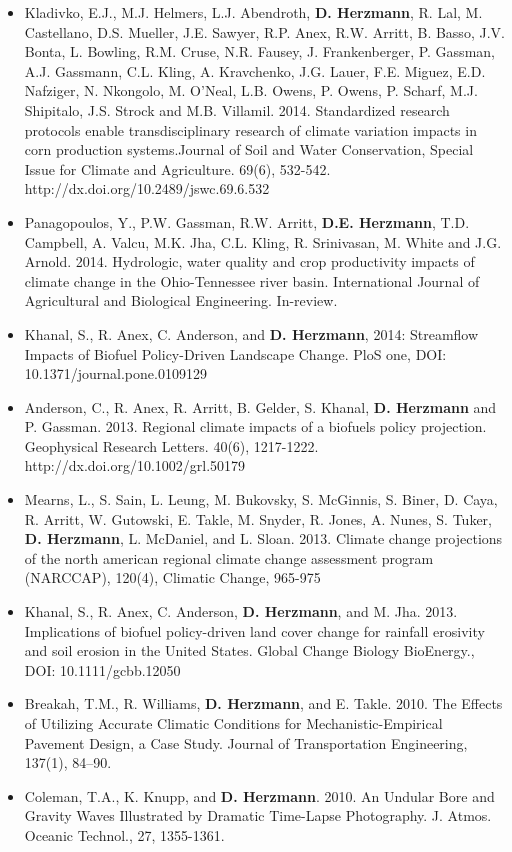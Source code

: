 \begin{itemize}
\item Kladivko, E.J., M.J. Helmers, L.J. Abendroth, \textbf{D. Herzmann}, R. Lal, M. Castellano, D.S. Mueller, J.E. Sawyer, R.P. Anex, R.W. Arritt, B. Basso, J.V. Bonta, L. Bowling, R.M. Cruse, N.R. Fausey, J. Frankenberger, P. Gassman, A.J. Gassmann, C.L. Kling, A. Kravchenko, J.G. Lauer, F.E. Miguez, E.D. Nafziger, N. Nkongolo, M. O'Neal, L.B. Owens, P. Owens, P. Scharf, M.J. Shipitalo, J.S. Strock and M.B. Villamil. 2014. Standardized research protocols enable transdisciplinary research of climate variation impacts in corn production systems.Journal of Soil and Water Conservation, Special Issue for Climate and Agriculture. 69(6), 532-542. http://dx.doi.org/10.2489/jswc.69.6.532
\item Panagopoulos, Y., P.W. Gassman, R.W. Arritt, \textbf{D.E. Herzmann}, T.D. Campbell, A. Valcu, M.K. Jha, C.L. Kling, R. Srinivasan, M. White and J.G. Arnold. 2014. Hydrologic, water quality and crop productivity impacts of climate change in the Ohio-Tennessee river basin. International Journal of Agricultural and Biological Engineering. In-review.
\item Khanal, S., R. Anex, C. Anderson, and \textbf{D. Herzmann}, 2014: Streamflow Impacts of Biofuel Policy-Driven Landscape Change. PloS one, DOI: 10.1371/journal.pone.0109129
\item Anderson, C., R. Anex, R. Arritt, B. Gelder, S. Khanal, \textbf{D. Herzmann} and P. Gassman. 2013. Regional climate impacts of a biofuels policy projection. Geophysical Research Letters. 40(6), 1217-1222. http://dx.doi.org/10.1002/grl.50179
\item Mearns, L., S. Sain, L. Leung, M. Bukovsky, S. McGinnis, S. Biner, D. Caya, R. Arritt, W. Gutowski, E. Takle, M. Snyder, R. Jones, A. Nunes, S. Tuker, \textbf{D. Herzmann}, L. McDaniel, and L. Sloan. 2013. Climate change projections of the north american regional climate change assessment program (NARCCAP), 120(4), Climatic Change, 965-975
\item Khanal, S., R. Anex, C. Anderson, \textbf{D. Herzmann}, and M. Jha. 2013. Implications of biofuel policy-driven land cover change for rainfall erosivity and soil erosion in the United States. Global Change Biology BioEnergy., DOI: 10.1111/gcbb.12050
\item Breakah, T.M., R. Williams, \textbf{D. Herzmann}, and E. Takle. 2010. The Effects of Utilizing Accurate Climatic Conditions for Mechanistic-Empirical Pavement Design, a Case Study. Journal of Transportation Engineering, 137(1), 84–90.
\item Coleman, T.A., K. Knupp, and \textbf{D. Herzmann}. 2010. An Undular Bore and Gravity Waves Illustrated by Dramatic Time-Lapse Photography. J. Atmos. Oceanic Technol., 27, 1355-1361.

\end{itemize}
